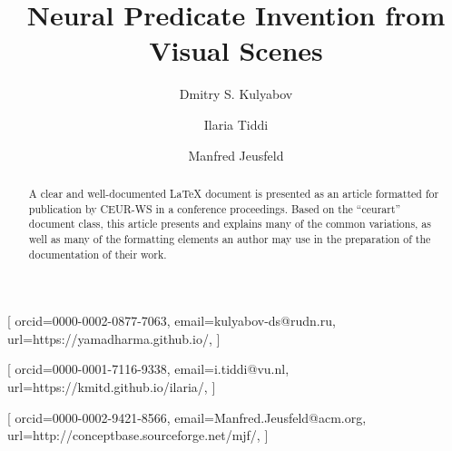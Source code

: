 \documentclass[
]{ceurart}
\begin{document}


\title{Neural Predicate Invention from Visual Scenes}

\tnotemark[1]

\author[1,2]{Dmitry S. Kulyabov}[%
orcid=0000-0002-0877-7063,
email=kulyabov-ds@rudn.ru,
url=https://yamadharma.github.io/,
]
\cormark[1]
\fnmark[1]
\address[1]{Peoples' Friendship University of Russia (RUDN University),
  6 Miklukho-Maklaya St, Moscow, 117198, Russian Federation}
\address[2]{Joint Institute for Nuclear Research,
  6 Joliot-Curie, Dubna, Moscow region, 141980, Russian Federation}

\author[3]{Ilaria Tiddi}[%
orcid=0000-0001-7116-9338,
email=i.tiddi@vu.nl,
url=https://kmitd.github.io/ilaria/,
]
\fnmark[1]
\address[3]{Vrije Universiteit Amsterdam, De Boelelaan 1105, 1081 HV Amsterdam, The Netherlands}

\author[4]{Manfred Jeusfeld}[%
orcid=0000-0002-9421-8566,
email=Manfred.Jeusfeld@acm.org,
url=http://conceptbase.sourceforge.net/mjf/,
]
\fnmark[1]
\address[4]{University of Skövde, Högskolevägen 1, 541 28 Skövde, Sweden}


\begin{abstract}
  A clear and well-documented \LaTeX{} document is presented as an
  article formatted for publication by CEUR-WS in a conference
  proceedings. Based on the ``ceurart'' document class, this article
  presents and explains many of the common variations, as well as many
  of the formatting elements an author may use in the preparation of
  the documentation of their work.
\end{abstract}
\end{document}
